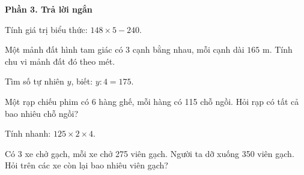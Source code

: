 \textbf{Phần 3. Trả lời ngắn}

\begin{ex} %
Tính giá trị biểu thức: $148 \times 5 - 240$.
\end{ex}

\begin{ex} %
Một mảnh đất hình tam giác có 3 cạnh bằng nhau, mỗi cạnh dài $165\text{ m}$. Tính chu vi mảnh đất đó theo mét.
\end{ex}

\begin{ex} %
Tìm số tự nhiên $y$, biết: $y : 4 = 175$.
\end{ex}

\begin{ex} %
Một rạp chiếu phim có 6 hàng ghế, mỗi hàng có 115 chỗ ngồi. Hỏi rạp có tất cả bao nhiêu chỗ ngồi?
\end{ex}

\begin{ex} %
Tính nhanh: $125 \times 2 \times 4$.
\end{ex}

\begin{ex} %
Có 3 xe chở gạch, mỗi xe chở 275 viên gạch. Người ta dỡ xuống 350 viên gạch. Hỏi trên các xe còn lại bao nhiêu viên gạch?
\end{ex}
